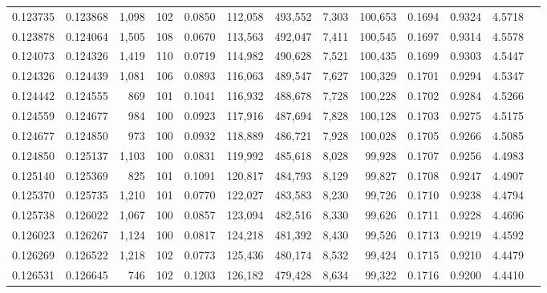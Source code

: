 \begin{tabular}{rrrrrrrrrrrrr}
0.123735 & 0.123868 & 1,098 & 102 &                                     0.0850 & 112,058 & 493,552 &   7,303 & 100,653 & 0.1694 & 0.9324 & 4.5718 \\
0.123878 & 0.124064 & 1,505 & 108 &                                     0.0670 & 113,563 & 492,047 &   7,411 & 100,545 & 0.1697 & 0.9314 & 4.5578 \\
0.124073 & 0.124326 & 1,419 & 110 &                                     0.0719 & 114,982 & 490,628 &   7,521 & 100,435 & 0.1699 & 0.9303 & 4.5447 \\
0.124326 & 0.124439 & 1,081 & 106 &                                     0.0893 & 116,063 & 489,547 &   7,627 & 100,329 & 0.1701 & 0.9294 & 4.5347 \\
0.124442 & 0.124555 &   869 & 101 &                                     0.1041 & 116,932 & 488,678 &   7,728 & 100,228 & 0.1702 & 0.9284 & 4.5266 \\
0.124559 & 0.124677 &   984 & 100 &                                     0.0923 & 117,916 & 487,694 &   7,828 & 100,128 & 0.1703 & 0.9275 & 4.5175 \\
0.124677 & 0.124850 &   973 & 100 &                                     0.0932 & 118,889 & 486,721 &   7,928 & 100,028 & 0.1705 & 0.9266 & 4.5085 \\
0.124850 & 0.125137 & 1,103 & 100 &                                     0.0831 & 119,992 & 485,618 &   8,028 &  99,928 & 0.1707 & 0.9256 & 4.4983 \\
0.125140 & 0.125369 &   825 & 101 &                                     0.1091 & 120,817 & 484,793 &   8,129 &  99,827 & 0.1708 & 0.9247 & 4.4907 \\
0.125370 & 0.125735 & 1,210 & 101 &                                     0.0770 & 122,027 & 483,583 &   8,230 &  99,726 & 0.1710 & 0.9238 & 4.4794 \\
0.125738 & 0.126022 & 1,067 & 100 &                                     0.0857 & 123,094 & 482,516 &   8,330 &  99,626 & 0.1711 & 0.9228 & 4.4696 \\
0.126023 & 0.126267 & 1,124 & 100 &                                     0.0817 & 124,218 & 481,392 &   8,430 &  99,526 & 0.1713 & 0.9219 & 4.4592 \\
0.126269 & 0.126522 & 1,218 & 102 &                                     0.0773 & 125,436 & 480,174 &   8,532 &  99,424 & 0.1715 & 0.9210 & 4.4479 \\
0.126531 & 0.126645 &   746 & 102 &                                     0.1203 & 126,182 & 479,428 &   8,634 &  99,322 & 0.1716 & 0.9200 & 4.4410 \\

\end{tabular}
